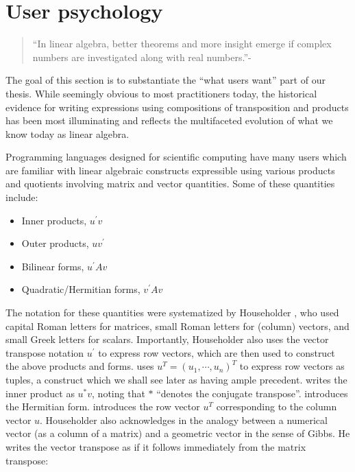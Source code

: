 \label{sec:householder}
\section{User psychology}

\begin{quote}
``In linear algebra, better theorems and more insight emerge if complex numbers
are investigated along with real numbers.''-\cite[p. 1]{Axler2015}
\end{quote}

The goal of this section is to substantiate the ``what users want'' part of our
thesis. While seemingly obvious to most practitioners today, the historical
evidence for writing expressions using compositions of transposition and
products has been most illuminating and reflects the multifaceted evolution of
what we know today as linear algebra.

Programming languages designed for scientific computing have many users which
are familiar with linear algebraic constructs expressible using various
products and quotients involving matrix and vector quantities. Some of these
quantities include:

\begin{itemize}
  \item Inner products, $u^\prime v$
  \item Outer products, $u v^\prime$
  \item Bilinear forms, $u^\prime A v$
  \item Quadratic/Hermitian forms, $v^\prime A v$
\end{itemize}

The notation for these quantities were systematized by Householder
\cite{Householder1953,Householder1955}, who used capital Roman letters for
matrices, small Roman letters for (column) vectors, and small Greek letters for
scalars. Importantly, Householder also uses the vector transpose notation
$u^\prime$ to express row vectors, which are then used to construct the above
products and forms. \cite{Householder1955} uses $u^T = {(u_1, \cdots, u_n)}^T$ to
express row vectors as tuples, a construct which we shall see later as having
ample precedent. \cite{Householder1955} writes the inner product as $u^* v$,
noting that $*$ ``denotes the conjugate transpose''. \cite[Sec.
4.01]{Householder1953} introduces the Hermitian form. \cite[Sec.
2.04]{Householder1953} introduces the row vector $u^T$ corresponding to the
column vector $u$. Householder also acknowledges in \cite[Sec.
2.04]{Householder1953} the analogy between a numerical vector (as a column of a
matrix) and a geometric vector in the sense of Gibbs. He writes the vector
transpose as if it follows immediately from the matrix transpose:

